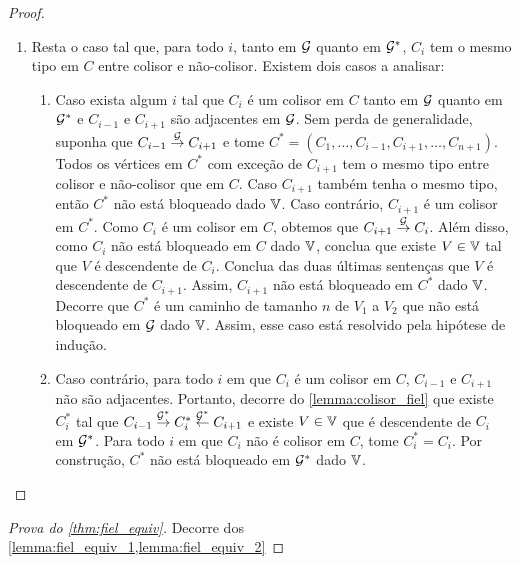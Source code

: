 \begin{proof}
\begin{enumerate}[label=\alph*)]
  \item Resta o caso tal que,
  para todo $i$, tanto em ${\mathcal G}$ quanto em ${\mathcal G}^*$,
  $C_i$ tem o mesmo tipo em $C$ entre
  colisor e não-colisor.
  Existem dois casos a analisar:
  \begin{enumerate}[label=\Roman*)]
   \item Caso exista algum $i$ tal que
   $C_i$ é um colisor em $C$ tanto em
   ${\mathcal G}$ quanto em ${\mathcal G}^*$ e
   $C_{i-1}$ e $C_{i+1}$ são adjacentes em ${\mathcal G}$.
   Sem perda de generalidade, suponha que
   $C_{i-1} \stackrel{{\mathcal G}}{\rightarrow} C_{i+1}$ e
   tome $C^* = (C_1, \ldots, C_{i-1}, C_{i+1}, \ldots, C_{n+1})$.
   Todos os vértices em $C^*$ com exceção de
   $C_{i+1}$ tem o mesmo tipo entre
   colisor e não-colisor que em $C$.
   Caso $C_{i+1}$ também tenha o mesmo tipo, então
   $C^*$ não está bloqueado dado ${\mathbb V}$.
   Caso contrário, $C_{i+1}$ é um colisor em $C^*$.
   Como $C_i$ é um colisor em $C$, obtemos que
   $C_{i+1} \stackrel{{\mathcal G}}{\rightarrow} C_i$.
   Além disso, como $C_i$ não está bloqueado em $C$ dado ${\mathbb V}$,
   conclua que existe $V \in {\mathbb V}$ tal que 
   $V$ é descendente de $C_i$.
   Conclua das duas últimas sentenças que
   $V$ é descendente de $C_{i+1}$.
   Assim, $C_{i+1}$ não está bloqueado em $C^*$ dado ${\mathbb V}$.
   Decorre que $C^*$ é um caminho de tamanho $n$ 
   de $V_1$ a $V_2$ que não está bloqueado em ${\mathcal G}$ dado ${\mathbb V}$.
   Assim, esse caso está resolvido pela hipótese de indução.
   
   \item Caso contrário, para todo $i$ em que
   $C_i$ é um colisor em $C$,
   $C_{i-1}$ e $C_{i+1}$ não são adjacentes.
   Portanto, decorre do \cref{lemma:colisor_fiel} que
   existe $C^*_{i}$ tal que
   $C_{i-1} \stackrel{{\mathcal G}^*}{\rightarrow} C^*_{i}
   \stackrel{{\mathcal G}^*}{\leftarrow} C_{i+1}$ e
   existe $V \in {\mathbb V}$ que é descendente de $C_i$ em ${\mathcal G}^*$.
   Para todo $i$ em que 
   $C_i$ não é colisor em $C$,
   tome $C^*_i = C_i$.
   Por construção, $C^*$ 
   não está bloqueado em ${\mathcal G}^*$ dado ${\mathbb V}$.
  \end{enumerate}
 \end{enumerate}
\end{proof}

\begin{proof}[Prova do \cref{thm:fiel_equiv}]
 Decorre dos \cref{lemma:fiel_equiv_1,lemma:fiel_equiv_2}
\end{proof}


